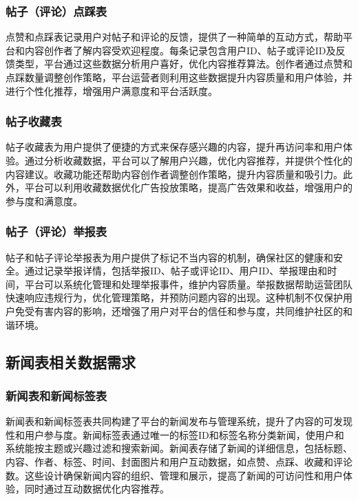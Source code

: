 \subsubsection{帖子（评论）点踩表}

点赞和点踩表记录用户对帖子和评论的反馈，提供了一种简单的互动方式，帮助平台和内容创作者了解内容受欢迎程度。每条记录包含用户ID、帖子或评论ID及反馈类型，平台通过这些数据分析用户喜好，优化内容推荐算法。创作者通过点赞和点踩数量调整创作策略，平台运营者则利用这些数据提升内容质量和用户体验，并进行个性化推荐，增强用户满意度和平台活跃度。

\subsubsection{帖子收藏表}

帖子收藏表为用户提供了便捷的方式来保存感兴趣的内容，提升再访问率和用户体验。通过分析收藏数据，平台可以了解用户兴趣，优化内容推荐，并提供个性化的内容建议。收藏功能还帮助内容创作者调整创作策略，提升内容质量和吸引力。此外，平台可以利用收藏数据优化广告投放策略，提高广告效果和收益，增强用户的参与度和满意度。

\subsubsection{帖子（评论）举报表}

帖子和帖子评论举报表为用户提供了标记不当内容的机制，确保社区的健康和安全。通过记录举报详情，包括举报ID、帖子或评论ID、用户ID、举报理由和时间，平台可以系统化管理和处理举报事件，维护内容质量。举报数据帮助运营团队快速响应违规行为，优化管理策略，并预防问题内容的出现。这种机制不仅保护用户免受有害内容的影响，还增强了用户对平台的信任和参与度，共同维护社区的和谐环境。

\subsection{新闻表相关数据需求}

\subsubsection{新闻表和新闻标签表}

新闻表和新闻标签表共同构建了平台的新闻发布与管理系统，提升了内容的可发现性和用户参与度。新闻标签表通过唯一的标签ID和标签名称分类新闻，使用户和系统能按主题或兴趣过滤和搜索新闻。新闻表存储了新闻的详细信息，包括标题、内容、作者、标签、时间、封面图片和用户互动数据，如点赞、点踩、收藏和评论数。这些设计确保新闻内容的组织、管理和展示，提高了新闻的可访问性和用户体验，同时通过互动数据优化内容推荐。


